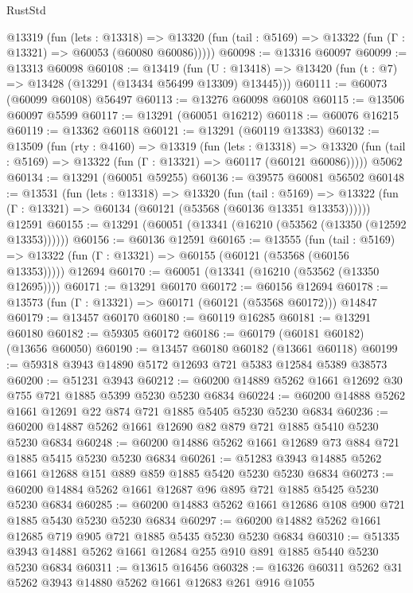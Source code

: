 \begin{lexlean}{RustStd}
\begin{coremodule}
    @13319
      (fun (lets : @13318) =>
      @13320 (fun (tail : @5169) => @13322 (fun (Γ : @13321) => @60053 (@60080 @60086)))))
@60098 := @13316 @60097
@60099 := @13313 @60098
@60108 := @13419
    (fun (U : @13418) => @13420 (fun (t : @7) => @13428 (@13291 (@13434 @56499 @13309) @13445)))
@60111 := @60073 (@60099 @60108) @56497
@60113 := @13276 @60098 @60108
@60115 := @13506 @60097 @5599
@60117 := @13291 (@60051 @16212)
@60118 := @60076 @16215
@60119 := @13362 @60118
@60121 := @13291 (@60119 @13383)
@60132 := @13509
    (fun (rty : @4160) =>
    @13319
      (fun (lets : @13318) =>
      @13320 (fun (tail : @5169) => @13322 (fun (Γ : @13321) => @60117 (@60121 @60086)))))
    @5062
@60134 := @13291 (@60051 @59255)
@60136 := @39575 @60081 @56502
@60148 := @13531
    (fun (lets : @13318) =>
    @13320
      (fun (tail : @5169) =>
      @13322 (fun (Γ : @13321) => @60134 (@60121 (@53568 (@60136 @13351 @13353))))))
    @12591
@60155 := @13291 (@60051 (@13341 (@16210 (@53562 (@13350 (@12592 @13353))))))
@60156 := @60136 @12591
@60165 := @13555
    (fun (tail : @5169) => @13322 (fun (Γ : @13321) => @60155 (@60121 (@53568 (@60156 @13353)))))
    @12694
@60170 := @60051 (@13341 (@16210 (@53562 (@13350 @12695))))
@60171 := @13291 @60170
@60172 := @60156 @12694
@60178 := @13573 (fun (Γ : @13321) => @60171 (@60121 (@53568 @60172))) @14847
@60179 := @13457 @60170
@60180 := @60119 @16285
@60181 := @13291 @60180
@60182 := @59305 @60172
@60186 := @60179 (@60181 @60182) (@13656 @60050)
@60190 := @13457 @60180 @60182 (@13661 @60118)
@60199 := @59318 @3943 @14890 @5172 @12693 @721 @5383 @12584 @5389 @38573
@60200 := @51231 @3943
@60212 := @60200 @14889 @5262 @1661 @12692 @30 @755 @721 @1885 @5399 @5230 @5230 @6834
@60224 := @60200 @14888 @5262 @1661 @12691 @22 @874 @721 @1885 @5405 @5230 @5230 @6834
@60236 := @60200 @14887 @5262 @1661 @12690 @82 @879 @721 @1885 @5410 @5230 @5230 @6834
@60248 := @60200 @14886 @5262 @1661 @12689 @73 @884 @721 @1885 @5415 @5230 @5230 @6834
@60261 := @51283 @3943 @14885 @5262 @1661 @12688 @151 @889 @859 @1885 @5420 @5230 @5230 @6834
@60273 := @60200 @14884 @5262 @1661 @12687 @96 @895 @721 @1885 @5425 @5230 @5230 @6834
@60285 := @60200 @14883 @5262 @1661 @12686 @108 @900 @721 @1885 @5430 @5230 @5230 @6834
@60297 := @60200 @14882 @5262 @1661 @12685 @719 @905 @721 @1885 @5435 @5230 @5230 @6834
@60310 := @51335 @3943 @14881 @5262 @1661 @12684 @255 @910 @891 @1885 @5440 @5230 @5230 @6834
@60311 := @13615 @16456
@60328 := @16326
    @60311
    @5262
    @31
    @5262
    @3943
    @14880
    @5262
    @1661
    @12683
    @261
    @916
    @1055

\end{coremodule}
\end{lexlean}
